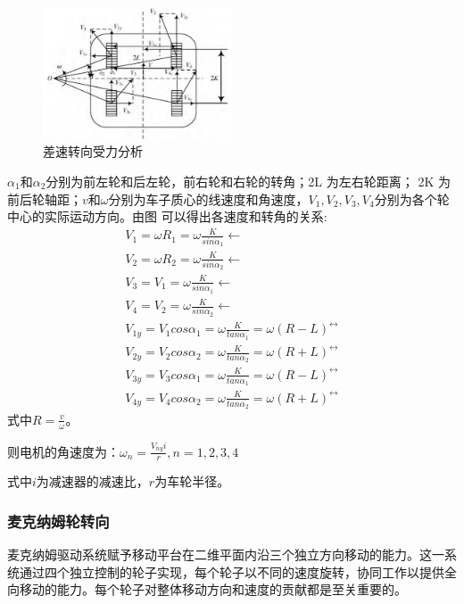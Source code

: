 \documentclass{report}
\begin{document}
\begin{figure}[ht]
  \centering
  \includegraphics[width=0.5\textwidth]{figures/chasu.png}
  \caption{差速转向受力分析}
\end{figure}
\newpage
$\alpha_1$和$\alpha_2$分别为前左轮和后左轮，前右轮和右轮的转角；2L 为左右轮距离； 2K 为前后轮轴距；$v$和$\omega$分别为车子质心的线速度和角速度，$V_1,V_2,V_3,V_4$分别为各个轮中心的实际运动方向。由图 可以得出各速度和转角的关系:
\[\begin{gathered}
V_{1}=\omega R_{1}=\omega\frac{K}{sin\alpha_{1}}\leftarrow \\
V_{2}=\omega R_{2}=\omega\frac{K}{sin\alpha_{2}}\leftarrow \\
V_{3}=V_{1}=\omega\frac{K}{sin\alpha_{1}}\leftarrow \\
V_{4}=V_{2}=\omega\frac{K}{sin\alpha_{2}}\leftarrow \\
V_{1y}=V_{1}cos\alpha_{1}= \omega\frac{K}{tan\alpha_{1}}=\omega(R-L)^{\leftrightarrow}\\
V_{2y}=V_{2}cos\alpha_{2}= \omega\frac{K}{tan\alpha_{2}}=\omega(R+L)^{\leftrightarrow}\\
V_{3y}=V_{3}cos\alpha_{1}= \omega\frac{K}{tan\alpha_{1}}=\omega(R-L)^{\leftrightarrow}\\
V_{4y}=V_{4}cos\alpha_{2}= \omega\frac{K}{tan\alpha_{2}}=\omega(R+L)^{\leftrightarrow}
\end{gathered}\]
式中$R=\frac v\omega $。

则电机的角速度为：$\omega_n=\frac{V_{ny}i}r,n=1,2,3,4$

式中$i$为减速器的减速比，$r$为车轮半径。


\subsubsection{麦克纳姆轮转向\cite{mac}}
\label{subsec:label}
麦克纳姆驱动系统赋予移动平台在二维平面内沿三个独立方向移动的能力。这一系统通过四个独立控制的轮子实现，每个轮子以不同的速度旋转，协同工作以提供全向移动的能力。每个轮子对整体移动方向和速度的贡献都是至关重要的。
\end{document}
